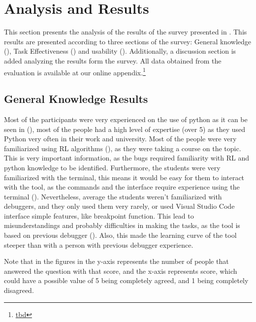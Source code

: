 
\section{Analysis and Results}
\label{sec:results}

This section presents the analysis of the results of the survey presented in . 
This results are presented according to three sections of the survey: General knowledge (),
Task Effectiveness () and usability (). Additionally, a 
discussion section is added analyzing the results form the survey. All data obtained from the evaluation is available at our online appendix.\footnote{\url{tbd}} 

\subsection{General Knowledge Results}
\label{sec:general-knowledge}

Most of the participants were very experienced on the use of python as it
can be seen in (), most of the people had a high level of expertise (over 5)
as they used Python very often in their work and university. 
Most of the people were very familiarized using \ac{RL} algorithms (), as they were 
taking a course on the topic. This is very important information, as the bugs required familiarity with \ac{RL} and python 
knowledge to be identified. Furthermore, the students were very familiarized with 
the terminal, this means it would be easy for them to interact with the tool, as the commands 
and the interface require experience using the terminal (). Nevertheless, 
average the 
students weren't familiarized with debuggers, and they only used them very rarely, or used 
Visual Studio Code interface simple features, like breakpoint function. This lead to 
misunderstandings and probably difficulties in making the tasks, as the tool is based on
previous debugger (). Also, this made the learning curve of the tool 
steeper than with a person with previous debugger experience.

Note that in the figures in  the y-axis represents the number of people 
that answered the question with that score, and the x-axis represents score, which could have a 
possible value of 5 being completely agreed, and 1 being completely disagreed.

